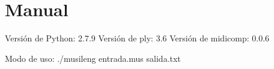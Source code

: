 \section{Manual}

Versión de Python: 2.7.9
Versión de ply: 3.6
Versión de midicomp: 0.0.6

Modo de uso:
./musileng entrada.mus salida.txt
